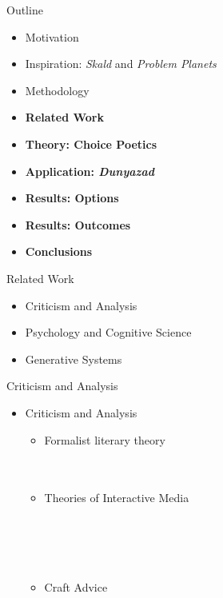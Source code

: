 \documentclass[xcolor=x11names]{beamer}
\def\dunyazad/{\textit{Dunyazad}}
\def\skald/{\textit{Skald}}
\def\problemplanets/{\textit{Problem Planets}}
\begin{document}
\begin{frame}{Outline}
  \begin{itemize}
    \item Motivation
    \item Inspiration: \skald/ and \problemplanets/
    \item Methodology
    \item \textbf{Related Work}
    \item \textbf{Theory: Choice Poetics}
    \item \textbf{Application: \dunyazad/}
    \item \textbf{Results: Options}
    \item \textbf{Results: Outcomes}
    \item \textbf{Conclusions}
  \end{itemize}
\end{frame}

\begin{frame}{Related Work}
  \begin{itemize}\addtolength{\itemsep}{0.5\baselineskip}
    \item Criticism and Analysis
    \item Psychology and Cognitive Science
    \item Generative Systems
  \end{itemize}
\end{frame}

\begin{frame}{Criticism and Analysis}
  \begin{itemize}\addtolength{\itemsep}{0.5\baselineskip}
    \item Criticism and Analysis
    \begin{itemize}\addtolength{\itemsep}{0.5\baselineskip}
      \vspace{0.5\baselineskip}
      \item Formalist literary theory \\ \vspace{0.3\baselineskip}
        \tiny
         \\
         \\

      \item \small Theories of Interactive Media \\ \vspace{0.3\baselineskip}
        \tiny
         \\
         \\
         \\
         \\

      \item \small Craft Advice \\ \vspace{0.3\baselineskip}
        \tiny
         \\
    \end{itemize}
  \end{itemize}
\end{frame}
\end{document}
